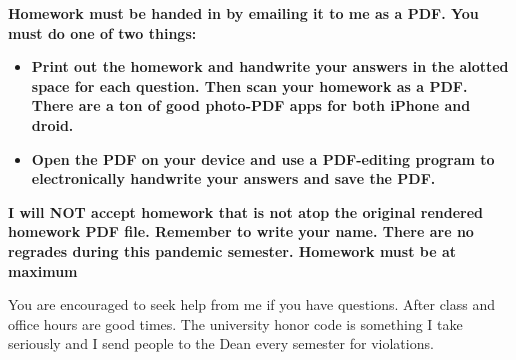 


\textbf{Homework must be handed in by emailing it to me as a PDF. You must do one of two things:}

\begin{itemize}
\item \textbf{Print out the homework and handwrite your answers in the alotted space for each question. Then scan your homework as a PDF. There are a ton of good photo-PDF apps for both iPhone and droid. }
\item \textbf{Open the PDF on your device and use a PDF-editing program to electronically handwrite your answers and save the PDF.}
\end{itemize}

\textbf{I will NOT accept homework that is not atop the original rendered homework PDF file. Remember to write your name. There are no regrades during this pandemic semester. Homework must be at maximum }

You are encouraged to seek help from me if you have questions. After class and office hours are good times.   The university honor code is something I take seriously and I send people to the Dean every semester for violations.